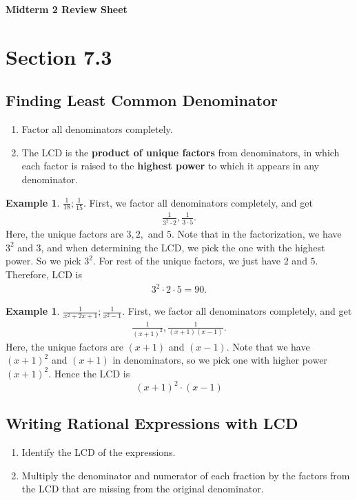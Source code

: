 \documentclass[11pt]{article}
\theoremstyle{plain}
\theoremstyle{definition}
\newtheorem{example}[theorem]{Example}
\theoremstyle{remark}
\begin{document}
\begin{center} \large\bf{Midterm 2 Review Sheet}\end{center}

\section{Section 7.3}
\subsection{Finding Least Common Denominator}
\begin{enumerate}[1)]
\item Factor all denominators completely.
\item The LCD is the \textbf{product of unique factors} from denominators, in which each factor is raised to the \textbf{highest power} to which it appears in any denominator.
\end{enumerate}

\begin{example}
$\frac{1}{18};\frac{1}{15}  $. First, we factor all denominators completely, and get 
\begin{align*}
\frac{1}{3^{2}\cdot 2}, \frac{1}{3\cdot 5}.  
\end{align*}
Here, the unique factors are $3, 2, $ and $5.$ Note that in the factorization, we have $3^{2}$ and $3$, and when determining the LCD, we pick the one with the highest power. So we pick $3^{2}.$ For rest of the unique factors, we just have $2$ and $5$. Therefore, LCD is 
\begin{align*}
3^{2}\cdot 2\cdot 5=90.
\end{align*}
\end{example}
\begin{example}
$\frac{1}{x^{2}+2x+1};\frac{1}{x^{2}-1}.  $ First, we factor all denominators completely, and get 
\begin{align*}
\frac{1}{(x+1)^{2}}, \frac{1}{(x+1)(x-1)}.  
\end{align*}
Here, the unique factors are $(x+1)$ and $(x-1).$ Note that we have $(x+1)^{2}$ and $(x+1)$ in denominators, so we pick one with higher power $(x+1)^{2}.$ Hence the LCD is $$(x+1)^{2}\cdot (x-1)$$
\end{example}
\subsection{Writing Rational Expressions with LCD}
\begin{enumerate}[1)]
\item Identify the LCD of the expressions. 
\item Multiply the denominator and numerator of each fraction by the factors from the LCD that are missing from the original denominator. 
\end{enumerate}
\newpage
\end{document}
